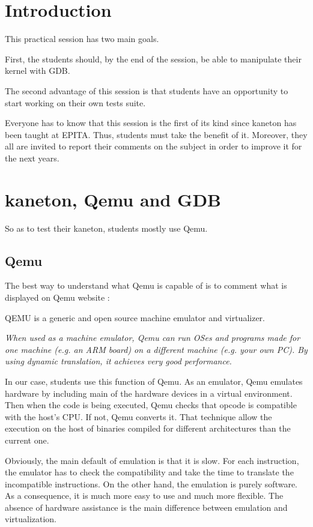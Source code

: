 \chapter{Introduction}
\label{chapter:Introduction}

This practical session has two main goals.

First, the students should, by the end of the session, be able to manipulate their kernel with GDB.

The second advantage of this session is that students have an opportunity to start working on their own tests suite.

Everyone has to know that this session is the first of its kind since kaneton has been taught at EPITA. Thus, students must take the benefit of it. Moreover, they all are invited to report their comments on the subject in order to improve it for the next years.

\chapter{kaneton, Qemu and GDB}
\label{chapter:kaneton, Qemu and GDB}

So as to test their kaneton, students mostly use Qemu.

\section{Qemu}
The best way to understand what Qemu is capable of is to comment what is displayed on Qemu website :

QEMU is a generic and open source machine emulator and virtualizer.

\textit{When used as a machine emulator, Qemu can run OSes and programs made for one machine (e.g. an ARM board) on a different machine (e.g. your own PC). By using dynamic translation, it achieves very good performance.}

In our case, students use this function of Qemu. As an emulator, Qemu emulates hardware by including main of the hardware devices in a virtual environment. Then when the code is being executed, Qemu checks that opcode is compatible with the host's CPU. If not, Qemu converts it. That technique allow the execution on the host of binaries compiled for different architectures than the current one.

Obviously, the main default of emulation is that it is slow. For each instruction, the emulator has to check the compatibility and take the time to translate the incompatible instructions. On the other hand, the emulation is purely software. As a consequence, it is much more easy to use and much more flexible. The absence of hardware assistance is the main difference between emulation and virtualization.


